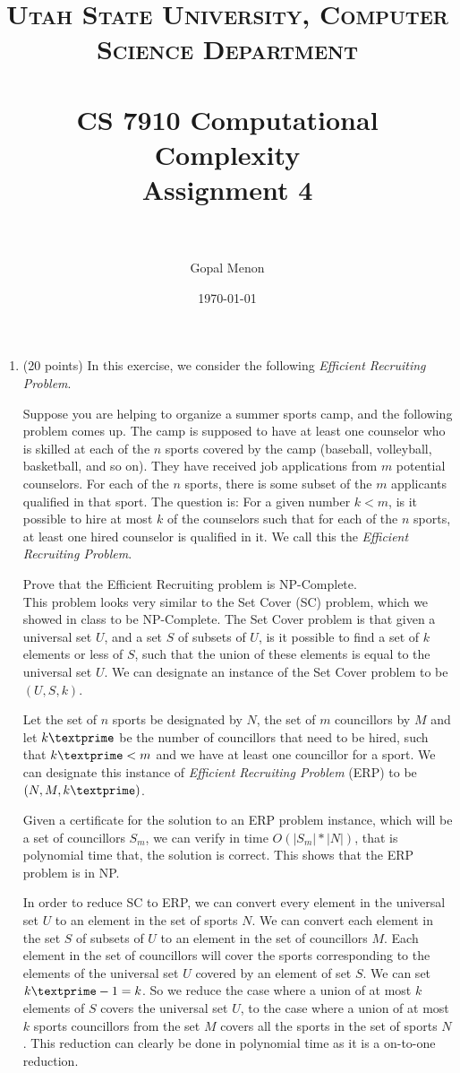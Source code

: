 \documentclass[paper=a4, fontsize=11pt]{scrartcl} %
\title{	
\normalfont \normalsize 
\textsc{Utah State University, Computer Science Department} \\ [25pt] %
\horrule{0.5pt} \\[0.4cm] %
\huge CS 7910 Computational Complexity\\Assignment 4 \\ %
\horrule{2pt} \\[0.5cm] %
}
\author{Gopal Menon} %
\date{\normalsize\today} %
\numberwithin{equation}{section} %
\numberwithin{figure}{section} %
\numberwithin{table}{section} %
\begin{document}
\maketitle %

\begin{enumerate}
\item (20 points) In this exercise, we consider the following \textit{Efficient Recruiting Problem}.

Suppose you are helping to organize a summer sports camp, and the following problem comes up. The camp is supposed to have at least one counselor who is skilled at each of the $n$ sports covered by the camp (baseball, volleyball, basketball, and so on). They have received job applications from $m$ potential counselors. For each of the $n$ sports, there is some subset of the $m$ applicants qualified in that sport. The question is: For a given number $k < m$, is it possible to hire at most $k$ of the counselors such that for each of the $n$ sports, at least one hired counselor is qualified in it. We call this the \textit{Efficient Recruiting Problem}.

Prove that the Efficient Recruiting problem is NP-Complete.\\

This problem looks very similar to the Set Cover (SC) problem, which we showed in class to be NP-Complete. The Set Cover problem is that given a universal set $U$, and a set $S$ of subsets of $U$, is it possible to find a set of $k$ elements or less of $S$, such that the union of these elements is equal to the universal set $U$. We can designate an instance of the Set Cover problem to be $(U, S, k)$.

Let the set of $n$ sports be designated by $N$, the set of $m$ councillors by $M$ and let $k\textprime$ be the number of councillors that need to be hired, such that $k\textprime < m$ and we have at least one councillor for a sport. We can designate this instance of \textit{Efficient Recruiting Problem} (ERP) to be $(N, M, k\textprime)$.

Given a certificate for the solution to an ERP problem instance, which will be a set of councillors $S_m$, we can verify in time $O(\left | S_m \right | * \left | N \right |)$, that is polynomial time that, the solution is correct. This shows that the ERP problem is in NP.

In order to reduce SC to ERP, we can convert every element in the universal set $U$ to an element in the set of sports $N$. We can convert each element in the set $S$ of subsets of $U$ to an element in the set of councillors $M$. Each element in the set of councillors will cover the sports corresponding to the elements of the universal set $U$ covered by an element of set $S$. We can set $k\textprime - 1 = k$. So we reduce the case where a union of at most $k$ elements of $S$ covers the universal set $U$, to the case where a union of at most $k$ sports councillors from the set $M$ covers all the sports in the set of sports $N$. This reduction can clearly be done in polynomial time as it is a on-to-one reduction.


\end{enumerate}
\end{document}
